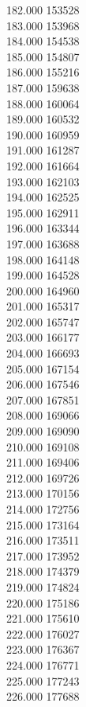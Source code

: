 { 182.000	153528 \\
 183.000	153968 \\
 184.000	154538 \\
 185.000	154807 \\
 186.000	155216 \\
 187.000	159638 \\
 188.000	160064 \\
 189.000	160532 \\
 190.000	160959 \\
 191.000	161287 \\
 192.000	161664 \\
 193.000	162103 \\
 194.000	162525 \\
 195.000	162911 \\
 196.000	163344 \\
 197.000	163688 \\
 198.000	164148 \\
 199.000	164528 \\
 200.000	164960 \\
 201.000	165317 \\
 202.000	165747 \\
 203.000	166177 \\
 204.000	166693 \\
 205.000	167154 \\
 206.000	167546 \\
 207.000	167851 \\
 208.000	169066 \\
 209.000	169090 \\
 210.000	169108 \\
 211.000	169406 \\
 212.000	169726 \\
 213.000	170156 \\
 214.000	172756 \\
 215.000	173164 \\
 216.000	173511 \\
 217.000	173952 \\
 218.000	174379 \\
 219.000	174824 \\
 220.000	175186 \\
 221.000	175610 \\
 222.000	176027 \\
 223.000	176367 \\
 224.000	176771 \\
 225.000	177243 \\
 226.000	177688 \\
}
